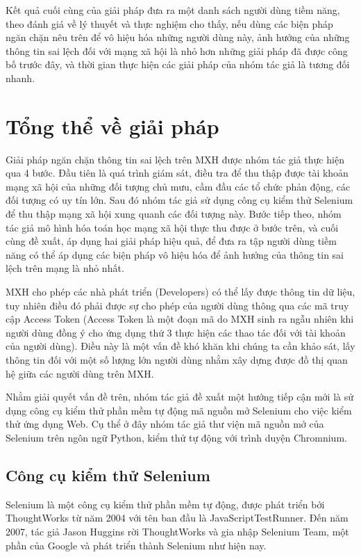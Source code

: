 Kết quả cuối cùng của giải pháp đưa ra một danh sách người dùng tiềm năng, theo đánh giá về lý thuyết và thực nghiệm cho thấy, nếu dùng các biện pháp ngăn chặn nêu trên để vô hiệu hóa những người dùng này, ảnh hưởng của những thông tin sai lệch đối với mạng xã hội là nhỏ hơn những giải pháp đã được công bố trước đây, và thời gian thực hiện các giải pháp của nhóm tác giả là tương đối nhanh.

\section{Tổng thể về giải pháp}
Giải pháp ngăn chặn thông tin sai lệch trên MXH được nhóm tác giả thực hiện qua 4 bước. Đầu tiên là quá trình giám sát, điều tra để thu thập được tài khoản mạng xã hội của những đối tượng chủ mưu, cầm đầu các tổ chức phản động, các đối tượng có uy tín lớn. Sau đó nhóm tác giả sử dụng công cụ kiểm thử Selenium để thu thập mạng xã hội xung quanh các đối tượng này. Bước tiếp theo, nhóm tác giả mô hình hóa toán học mạng xã hội thực thu được ở bước trên, và cuối cùng đề xuất, áp dụng hai giải pháp hiệu quả, để đưa ra tập người dùng tiềm năng có thể áp dụng các biện pháp vô hiệu hóa để ảnh hưởng của thông tin sai lệch trên mạng là nhỏ nhất.

MXH cho phép các nhà phát triển (Developers) có thể lấy được thông tin dữ liệu, tuy nhiên điều đó phải được sự cho phép của người dùng thông qua các mã truy cập Access Token (Access Token là một đoạn mã do MXH sinh ra ngẫu nhiên khi người dùng đồng ý cho ứng dụng thứ 3 thực hiện các thao tác đối với tài khoản của người dùng). Điều này là một vấn đề khó khăn khi chúng ta cần khảo sát, lấy thông tin đối với một số lượng lớn người dùng nhằm xây dựng được đồ thị quan hệ giữa các người dùng trên MXH.

Nhằm giải quyết vấn đề trên, nhóm tác giả đề xuất một hướng tiếp cận mới là sử dụng công cụ kiểm thử phần mềm tự động mã nguồn mở Selenium cho việc kiểm thử ứng dụng Web. Cụ thể ở đây nhóm tác giả thư viện mã nguồn mở của Selenium trên ngôn ngữ Python, kiểm thử tự động với trình duyện Chromnium.
	\subsection{Công cụ kiểm thử Selenium}
	Selenium là một công cụ kiểm thử phần mềm tự động, được phát triển bởi ThoughtWorks từ năm 2004 với tên ban đầu là JavaScriptTestRunner. Đến năm 2007, tác giả Jason Huggins rời ThoughtWorks và gia nhập Selenium Team, một phần của Google và phát triển thành Selenium như hiện nay.
	
